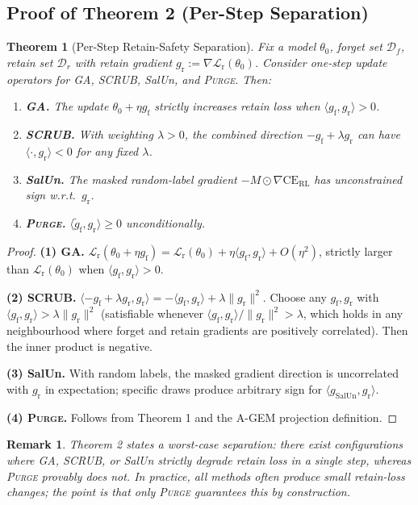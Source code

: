 \documentclass[letterpaper]{article}
\newcommand{\ours}{\textsc{Purge}}
\newcommand{\CE}{\mathrm{CE}}
\newcommand{\Df}{\mathcal{D}_f}
\newcommand{\Dr}{\mathcal{D}_r}
\newcommand{\gf}{g_{\mathrm{f}}}
\newcommand{\gr}{g_{\mathrm{r}}}
\newcommand{\gproj}{\tilde{g}_{\mathrm{f}}}
\newcommand{\lossr}{\mathcal{L}_{\mathrm{r}}}
\newtheorem{theorem}{Theorem}
\newtheorem{remark}{Remark}
\begin{document}
\subsection{Proof of Theorem 2 (Per-Step Separation)}

\begin{theorem}[Per-Step Retain-Safety Separation]
Fix a model $\theta_0$, forget set $\Df$, retain set $\Dr$ with retain gradient $\gr := \nabla\lossr(\theta_0)$. Consider one-step update operators for GA, SCRUB, SalUn, and \ours{}. Then:

\begin{enumerate}[nosep]
\item \textbf{GA.} The update $\theta_0 + \eta\gf$ strictly increases retain loss when $\langle \gf, \gr\rangle > 0$.
\item \textbf{SCRUB.} With weighting $\lambda>0$, the combined direction $-\gf + \lambda\gr$ can have $\langle \cdot, \gr\rangle < 0$ for any fixed $\lambda$.
\item \textbf{SalUn.} The masked random-label gradient $-M\odot\nabla\CE_{\mathrm{RL}}$ has unconstrained sign w.r.t.\ $\gr$.
\item \textbf{\ours{}.} $\langle \gproj, \gr \rangle \ge 0$ unconditionally.
\end{enumerate}
\end{theorem}

\begin{proof}
\textbf{(1) GA.}
$\lossr(\theta_0 + \eta\gf) = \lossr(\theta_0) + \eta\langle\gf,\gr\rangle + O(\eta^2)$, strictly larger than $\lossr(\theta_0)$ when $\langle\gf,\gr\rangle>0$.

\textbf{(2) SCRUB.}
$\langle -\gf + \lambda\gr, \gr\rangle = -\langle\gf,\gr\rangle + \lambda\|\gr\|^2$. Choose any $\gf,\gr$ with $\langle\gf,\gr\rangle > \lambda\|\gr\|^2$ (satisfiable whenever $\langle\gf,\gr\rangle/\|\gr\|^2 > \lambda$, which holds in any neighbourhood where forget and retain gradients are positively correlated). Then the inner product is negative.

\textbf{(3) SalUn.}
With random labels, the masked gradient direction is uncorrelated with $\gr$ in expectation; specific draws produce arbitrary sign for $\langle g_{\text{SalUn}},\gr\rangle$.

\textbf{(4) \ours{}.}
Follows from Theorem 1 and the A-GEM projection definition.
\end{proof}

\begin{remark}
Theorem 2 states a \emph{worst-case} separation: there exist configurations where GA, SCRUB, or SalUn strictly degrade retain loss in a single step, whereas \ours{} provably does not. In practice, all methods often produce small retain-loss changes; the point is that only \ours{} \emph{guarantees} this by construction.
\end{remark}
\end{document}
